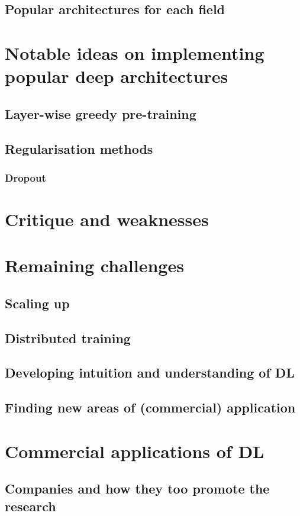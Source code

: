 \documentclass[]{article}
\begin{document}
\subsection{Popular architectures for each field}
\section{Notable ideas on implementing popular deep architectures}
\subsection{Layer-wise greedy pre-training}
\subsection{Regularisation methods}
\subsubsection{Dropout}
\section{Critique and weaknesses}
\section{Remaining challenges}
\subsection{Scaling up}
\subsection{Distributed training}
\subsection{Developing intuition and understanding of DL}
\subsection{Finding new areas of (commercial) application}
\section{Commercial applications of DL}
\subsection{Companies and how they too promote the research}
	
	
	
	
\end{document}
